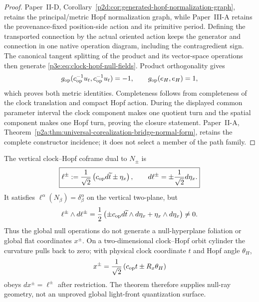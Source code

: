 \documentclass[12pt,a4paper]{article}
\begin{document}
\begin{proof}
Paper~II-D, Corollary~\ref{p2d:cor:generated-hopf-normalization-graph},
retains the principal/metric Hopf normalization graph, while Paper~III-A
retains the provenance-fixed position-side action and its primitive period.
Defining the transported connection by the actual oriented action keeps the
generator and connection in one native operation diagram, including the
contragredient sign.  The canonical tangent splitting of the product and its
vector-space operations then generate \eqref{p3e:eq:clock-hopf-null-fields}.
Product orthogonality gives
\[
 g_{\rm op}(c_{\rm op}^{-1}u_t,c_{\rm op}^{-1}u_t)=-1,
 \qquad g_{\rm op}(e_H,e_H)=1,
\]
which proves both metric identities.  Completeness follows from completeness
of the clock translation and compact Hopf action.  During the displayed
common parameter interval the clock component makes one quotient turn and
the spatial component makes one Hopf turn, proving the closure statement.
Paper~II-A,
Theorem~\ref{p2a:thm:universal-corealization-bridge-normal-form}, retains the
complete constructor incidence; it does not select a member of the path
family.
\end{proof}

\begin{corollary}
\label{p3e:cor:null-coframe-frobenius-boundary}
The vertical clock--Hopf coframe dual to \(N_\pm\) is
\begin{equation}
\label{p3e:eq:clock-hopf-null-coframe}
 \boxed{
 \ell^\pm:=\frac1{\sqrt2}
 \left(c_{\rm op}d\widetilde t\pm\eta_x\right),
 \qquad d\ell^\pm=\pm\frac1{\sqrt2}d\eta_x .}
\end{equation}
It satisfies \(\ell^\alpha(N_\beta)=\delta^\alpha_\beta\) on the vertical
two-plane, but
\begin{equation}
\label{p3e:eq:clock-hopf-frobenius-obstruction}
 \ell^\pm\wedge d\ell^\pm
 =\frac12\left(
 \pm c_{\rm op}d\widetilde t\wedge d\eta_x
 +\eta_x\wedge d\eta_x\right)\ne0 .
\end{equation}
Thus the global null operations do not generate a null-hyperplane foliation
or global flat coordinates \(x^\pm\).  On a two-dimensional clock--Hopf orbit
cylinder the curvature pulls back to zero; with physical clock coordinate
\(t\) and Hopf angle \(\theta_H\),
\[
 x^\pm=\frac1{\sqrt2}
 \left(c_{\rm op}t\pm R_x\theta_H\right)
\]
obeys \(dx^\pm=\ell^\pm\) after restriction.  The theorem therefore supplies
null-ray geometry, not an unproved global light-front quantization surface.
\end{corollary}
\end{document}
